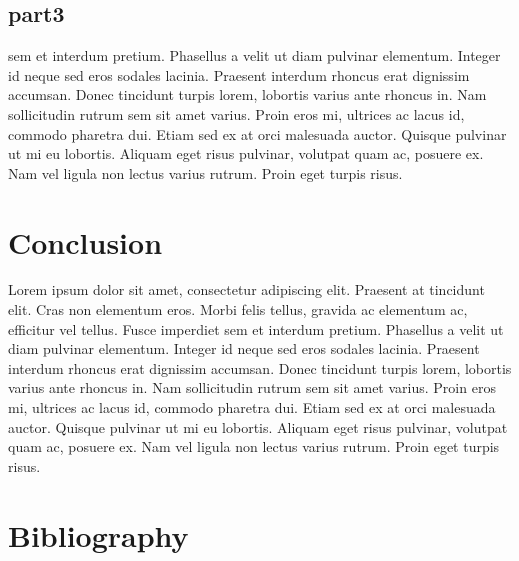 \documentclass[12pt]{article}
\begin{document}
	
	\subsection{part3}
	sem et interdum pretium. Phasellus a velit ut diam pulvinar elementum. Integer id neque sed eros sodales lacinia. Praesent interdum rhoncus erat dignissim accumsan. Donec tincidunt turpis lorem, lobortis varius ante rhoncus in. Nam sollicitudin rutrum sem sit amet varius. Proin eros mi, ultrices ac lacus id, commodo pharetra dui. Etiam sed ex at orci malesuada auctor. Quisque pulvinar ut mi eu lobortis. Aliquam eget risus pulvinar, volutpat quam ac, posuere ex. Nam vel ligula non lectus varius rutrum. Proin eget turpis risus.
	
	
	\section{Conclusion}
	Lorem ipsum dolor sit amet, consectetur adipiscing elit. Praesent at tincidunt elit. Cras non elementum eros. Morbi felis tellus, gravida ac elementum ac, efficitur vel tellus. Fusce imperdiet sem et interdum pretium. Phasellus a velit ut diam pulvinar elementum. Integer id neque sed eros sodales lacinia. Praesent interdum rhoncus erat dignissim accumsan. Donec tincidunt turpis lorem, lobortis varius ante rhoncus in. Nam sollicitudin rutrum sem sit amet varius. Proin eros mi, ultrices ac lacus id, commodo pharetra dui. Etiam sed ex at orci malesuada auctor. Quisque pulvinar ut mi eu lobortis. Aliquam eget risus pulvinar, volutpat quam ac, posuere ex. Nam vel ligula non lectus varius rutrum. Proin eget turpis risus.
	
	\section{Bibliography}%
\end{document}
